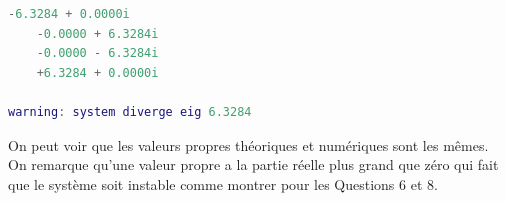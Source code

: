 \documentclass[class=article, crop=false]{standalone}
\begin{document}
\begin{resolution}
\begin{scriptsize}
\begin{lstlisting}[language=Matlab]
    -6.3284 + 0.0000i
    -0.0000 + 6.3284i
    -0.0000 - 6.3284i
    +6.3284 + 0.0000i
    
warning: system diverge eig 6.3284
        \end{lstlisting}
    \end{scriptsize}
    On peut voir que les valeurs propres théoriques et numériques sont les mêmes.\\

    On remarque qu'une valeur propre a la partie réelle plus grand que zéro qui fait que le système soit instable comme montrer pour les Questions 6 et 8.\\
\end{resolution}
\end{document}
